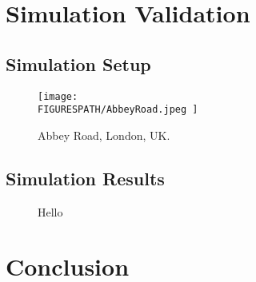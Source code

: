 \documentclass[conference]{IEEEtran}
\newcommand*{\FIGURESPATH}{./figures}
\newcommand*{\template}{template}
\begin{document}
\section{Simulation Validation}

\subsection{Simulation Setup}

\color{blue}\lipsum[1-2]\color{black}

\begin{figure*}[!t]
	\centering
	\texttt{[image: 
		\\FIGURESPATH/AbbeyRoad.jpeg
		]}
	\caption{
		Abbey Road, London, UK.
	}
	\label{fig:AbbeyRoad}
\end{figure*}

\subsection{Simulation Results}
\color{blue}\lipsum[1-2]\color{black}

\begin{figure}[!t]
    \centering
	\vspace{1mm}
    \caption{
		Hello
	}
	\label{fig:ctrl_result2}
\end{figure}

\section{Conclusion}

\color{blue}\lipsum[1]\color{black}



\end{document}
